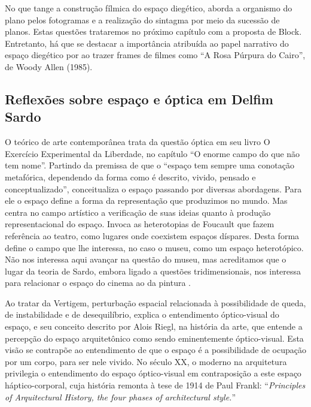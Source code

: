 No que tange a construção fílmica do espaço diegético,
\parencite[89]{gardies2019espaco} aborda a organismo do plano pelos
fotogramas e a realização do sintagma por meio da sucessão de planos.
Estas questões trataremos no próximo capítulo com a proposta de Block.
Entretanto, há que se destacar a importância atribuída ao papel
narrativo do espaço diegético por \textcite{gardies2019espaco} ao
trazer frames de filmes como \enquote{A Rosa Púrpura do Cairo}, de
Woody Allen (1985).

\subsection{Reflexões sobre espaço e óptica em Delfim Sardo}%
\label{reflexoes-espaco-delfim-sardo}

O teórico de arte contemporânea \textcite{sardo2017exercicio} trata da
questão óptica em seu livro O Exercício Experimental da Liberdade, no
capítulo \enquote{O enorme campo do que não tem nome}. Partindo da
premissa de que o \enquote{espaço tem sempre uma conotação metafórica,
	dependendo da forma como é descrito, vivido, pensado e
	conceptualizado}, \textcite{sardo2017exercicio} conceitualiza o espaço
passando por diversas abordagens. Para ele o espaço define a forma da
representação que produzimos no mundo. Mas centra no campo artístico a
verificação de suas ideias quanto à produção representacional do
espaço. Invoca as heterotopias de Foucault que fazem referência ao
teatro, como lugares onde coexistem espaços díspares. Desta forma
define o campo que lhe interessa, no caso o museu, como um espaço
heterotópico. Não nos interessa aqui avançar na questão do museu, mas
acreditamos que o lugar da teoria de Sardo, embora ligado a questões
tridimensionais, nos interessa para relacionar o espaço do cinema ao da
pintura \parencite[189-189]{sardo2017exercicio}.

Ao tratar da Vertigem, perturbação espacial relacionada à possibilidade
de queda, de instabilidade e de desequilíbrio, explica o entendimento
óptico-visual do espaço, e seu conceito descrito por Alois Riegl, na
história da arte, que entende a percepção do espaço arquitetônico como
sendo eminentemente óptico-visual. Esta visão se contrapõe ao
entendimento de que o espaço é a possibilidade de ocupação por um
corpo, para ser nele vivido. No século XX, o moderno na arquitetura
privilegia o entendimento do espaço óptico-visual em contraposição a
este espaço háptico-corporal, cuja história remonta à tese de 1914 de
Paul Frankl: \enquote{\emph{Principles of Arquitectural History, the
		four phases of architectural style.}}

